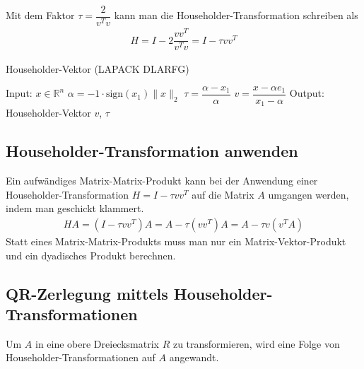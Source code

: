 Mit dem Faktor $\tau = \dfrac{2}{v^Tv}$ kann man die Householder-Transformation schreiben als
\begin{align*}
	H = I - 2 \dfrac{vv^T}{v^Tv} = I - \tau v v^T
\end{align*}



\begin{algorithm}
	\caption{Householder-Vektor (LAPACK DLARFG)}
	\begin{algorithmic}
		\State Input: $x \in \mathbb{R}^n$ \bigskip
		\State $\alpha = -1 \cdot \text{sign}(x_1) \|x\|_2$
		\State $\tau = \dfrac{\alpha - x_1}{\alpha}$
		\State $v=\dfrac{x - \alpha e_1}{x_1 - \alpha}$ \bigskip
		\State Output: Householder-Vektor $v$, $\tau$
	\end{algorithmic} 
	\label{alg:unblockedqr}
\end{algorithm}


\subsection{Householder-Transformation anwenden} \label{sec:appHHvec}
Ein aufwändiges Matrix-Matrix-Produkt kann bei der Anwendung einer Householder-Transformation $H = I - \tau vv^T$ auf die Matrix $A$ umgangen werden, indem man geschickt klammert.
\begin{align*} 
H A =(I - \tau vv^T) A= A - \tau (vv^T )A = A - \tau v(v^TA)
\end{align*}
Statt eines Matrix-Matrix-Produkts muss man nur ein Matrix-Vektor-Produkt und ein dyadisches Produkt berechnen.

\subsection{QR-Zerlegung mittels Householder-Transformationen}
Um $A$ in eine obere Dreiecksmatrix $R$ zu transformieren, wird eine Folge von Householder-Transformationen auf $A$ angewandt.

